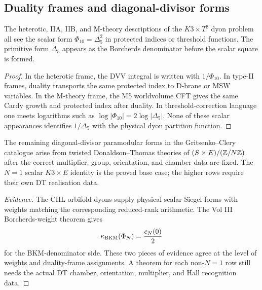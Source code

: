 \subsection*{Duality frames and diagonal-divisor forms}
\label{subsec:duality-frames-diagonal-divisor}

\begin{proposition}
\label{prop:four-frames-scalar-square}
The heterotic, IIA, IIB, and M-theory descriptions of the
$K3\times T^2$ dyon problem all see the scalar form
$\Phi_{10}=\Delta_5^2$ in protected indices or threshold functions. The
primitive form $\Delta_5$ appears as the Borcherds denominator before
the scalar square is formed.
\end{proposition}

\begin{proof}
In the heterotic frame, the DVV integral is written with
$1/\Phi_{10}$. In type-II frames, duality transports the same protected
index to D-brane or MSW variables. In the M-theory frame, the M5
worldvolume CFT gives the same Cardy growth and protected index after
duality. In threshold-correction language one meets logarithms such as
$\log|\Phi_{10}|=2\log|\Delta_5|$. None of these scalar appearances
identifies $1/\Delta_5$ with the physical dyon partition function.
\end{proof}

\begin{conjecture}
\label{conj:diagonal-divisor-dt-realisations}
The remaining diagonal-divisor paramodular forms in the
Gritsenko--Clery catalogue arise from twisted Donaldson--Thomas theories
of $(S\times E)/(\mathbb{Z}/N\mathbb{Z})$ after the correct multiplier, group,
orientation, and chamber data are fixed. The $N=1$ scalar
$K3\times E$ identity is the proved base case; the higher rows require
their own DT realisation data.
\end{conjecture}

\begin{proof}[Evidence]
The CHL orbifold dyons supply physical scalar Siegel forms with weights
matching the corresponding reduced-rank arithmetic. The Vol III
Borcherds-weight theorem gives
\[
 \kappa_{\mathrm{BKM}}(\Phi_N)=\frac{c_N(0)}{2}
\]
for the BKM-denominator side. These two pieces of evidence agree at the
level of weights and duality-frame assignments. A theorem for each
non-$N=1$ row still needs the actual DT chamber, orientation,
multiplier, and Hall recognition data.
\end{proof}

